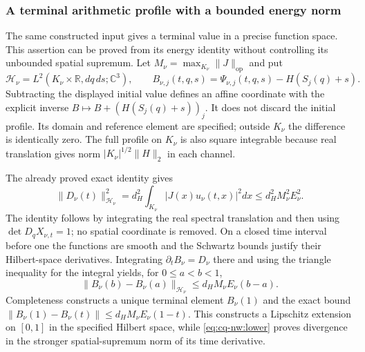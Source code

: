 \subsubsection{A terminal arithmetic profile with a bounded energy norm}

The same constructed input gives a terminal value in a precise
function space. This assertion can be proved from its energy identity
without controlling its unbounded spatial supremum. Let
$M_\nu=\max_{K_\nu}\|J\|_{\mathrm{op}}$ and put
\[
 \mathcal H_\nu=L^2(K_\nu\times\mathbb R,dq\,ds;\mathbb C^3),\qquad
 B_{\nu,j}(t,q,s)=\Psi_{\nu,j}(t,q,s)-H(S_j(q)+s).
\]
Subtracting the displayed initial value defines an affine coordinate
with the explicit inverse $B\mapsto B+(H(S_j(q)+s))_j$.
It does not discard the initial profile. Its domain and reference
element are specified; outside $K_\nu$ the difference is identically
zero. The full profile on $K_\nu$ is also square integrable because
real translation gives norm $|K_\nu|^{1/2}\|H\|_2$ in each channel.

The already proved exact identity gives
\[
 \|D_\nu(t)\|_{\mathcal H_\nu}^2
  =d_H^2\int_{K_\nu}|J(x)u_\nu(t,x)|^2dx
  \leq d_H^2M_\nu^2E_\nu^2.
\]
The identity follows by integrating the real spectral translation and
then using $\det D_qX_{\nu,t}=1$; no spatial coordinate is removed.
On a closed time interval before one the functions are smooth and the
Schwartz bounds justify their Hilbert-space derivatives. Integrating
$\partial_tB_\nu=D_\nu$ there and using the triangle inequality for
the integral yields, for $0\leq a<b<1$,
\begin{equation}
 \|B_\nu(b)-B_\nu(a)\|_{\mathcal H_\nu}
       \leq d_H M_\nu E_\nu(b-a).
 \label{eq:cq-nw:terminalrate}
\end{equation}
Completeness constructs a unique terminal element $B_\nu(1)$ and
the exact bound
$\|B_\nu(1)-B_\nu(t)\|\leq d_HM_\nu E_\nu(1-t)$.
This constructs a Lipschitz extension on $[0,1]$ in the specified
Hilbert space, while \eqref{eq:cq-nw:lower} proves divergence in the stronger
spatial-supremum norm of its time derivative.

